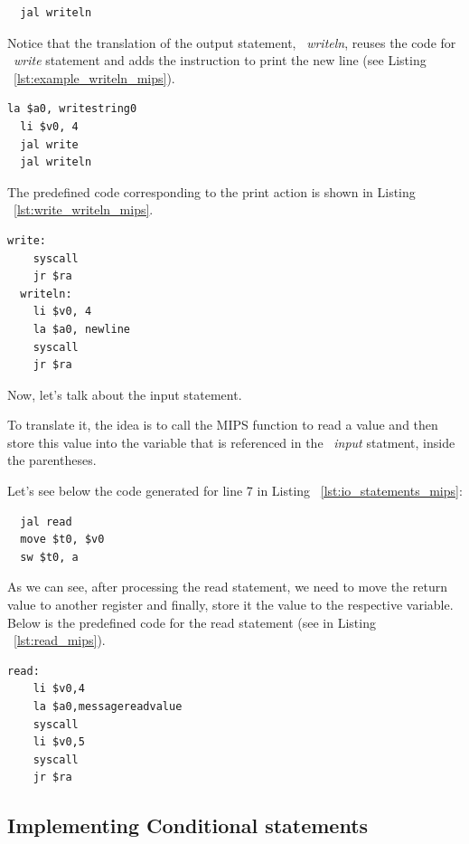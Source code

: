 \documentclass[
  oneside,
  11pt, a4paper,
  footinclude=true,
  headinclude=true,
  cleardoublepage=empty
]{scrbook}
\begin{document}
\begin{lstlisting}	
  jal writeln
\end{lstlisting}

Notice that the translation of the output statement, ~\textit{writeln}, reuses the code for ~\textit{write} statement and adds the instruction to print the new line (see Listing ~\ref{lst:example_writeln_mips}).

\begin{lstlisting}[caption={Code generated for line 6 in Listing ~\ref{lst:io_statements_mips}},label={lst:example_writeln_mips}]
  la $a0, writestring0
  li $v0, 4
  jal write	
  jal writeln
\end{lstlisting}

The predefined code corresponding to the print action is shown in Listing ~\ref{lst:write_writeln_mips}.

\begin{lstlisting}[caption={MIPS assembly code for write and writeln},label={lst:write_writeln_mips}]
  write: 
	syscall
	jr $ra
  writeln: 
	li $v0, 4
	la $a0, newline
	syscall
	jr $ra
\end{lstlisting}

Now, let's talk about the input statement.

To translate it, the idea is to call the MIPS function to read a value and then store this value into the variable that is referenced in the ~\textit{input} statment, inside the parentheses.

Let's see below the code generated for line 7 in Listing ~\ref{lst:io_statements_mips}:

\begin{lstlisting}
  jal read		
  move $t0, $v0		
  sw $t0, a		
\end{lstlisting}

As we can see, after processing the read statement, we need to move the return value to another register and finally, store it the value to the respective variable. Below is the predefined code for the read statement (see in Listing ~\ref{lst:read_mips}).

\begin{lstlisting}[caption={Read statement code in MIPS},label={lst:read_mips}]
  read: 
    li $v0,4
    la $a0,messagereadvalue
    syscall
    li $v0,5
    syscall
    jr $ra
\end{lstlisting}

\subsection{Implementing Conditional statements}
\end{document}
